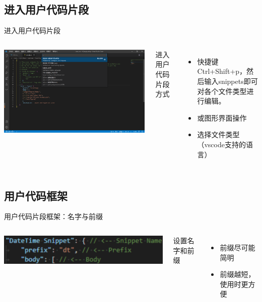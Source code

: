 \documentclass{beamer}
\begin{document}
\subsection{进入用户代码片段}
\begin{frame}{进入用户代码片段}
    \begin{columns}
        \begin{minipage}[c][\textheight][c]{\linewidth}
            \centering
            \includegraphics[scale=0.08]{pic/open.png}
        \end{minipage}
        进入用户代码片段方式
        \begin{itemize}
            \item 快捷键Ctrl+Shift+p，然后输入snippets即可对各个文件类型进行编辑。
            \item 或图形界面操作
            \item 选择文件类型（vscode支持的语言）
        \end{itemize}
    \end{columns}
\end{frame}

\subsection{用户代码框架}
\begin{frame}{用户代码片段框架：名字与前缀}
    \begin{columns}
        \begin{minipage}[c][\textheight][c]{\linewidth}
            \centering
            \includegraphics[scale=0.35]{pic/prefix.png}
        \end{minipage}
        设置名字和前缀
        \begin{itemize}
            \item 前缀尽可能简明
            \item 前缀越短，使用时更方便
        \end{itemize}
    \end{columns}
\end{frame}
\end{document}
